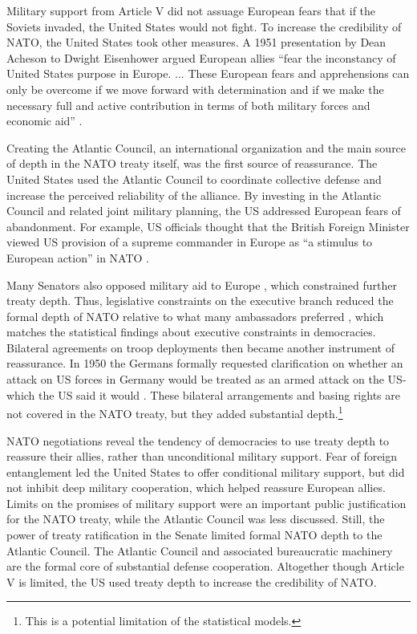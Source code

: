 \documentclass[12pt]{article}
\begin{document}
Military support from Article V did not assuage European fears that if the Soviets invaded, the United States would not fight. 
To increase the credibility of NATO, the United States took other measures.  
A 1951 presentation by Dean Acheson to Dwight Eisenhower argued European allies ``fear the inconstancy of United States purpose in Europe. ... These European fears and apprehensions can only be overcome if we move forward with determination and if we make the necessary full and active contribution in terms of both military forces and economic aid'' \citep[pg. 3]{Acheson1951}. 


Creating the Atlantic Council, an international organization and the main source of depth in the NATO treaty itself, was the first source of reassurance. 
The United States used the Atlantic Council to coordinate collective defense and increase the perceived reliability of the alliance. 
By investing in the Atlantic Council and related joint military planning, the US addressed European fears of abandonment. 
For example, US officials thought that the British Foreign Minister viewed US provision of a supreme commander in Europe as ``a stimulus to European action'' in NATO \citep{Acheson1950}. 


Many Senators also opposed military aid to Europe \citep[pg 285]{Acheson1969}, which constrained further treaty depth. 
Thus, legislative constraints on the executive branch reduced the formal depth of NATO relative to what many ambassadors preferred \citep[pg 277]{Acheson1969}, which matches the statistical findings about executive constraints in democracies.  
Bilateral agreements on troop deployments then became another instrument of reassurance. 
In 1950 the Germans formally requested clarification on whether an attack on US forces in Germany would be treated as an armed attack on the US- which the US said it would \citep[pg. 395]{Acheson1969}.  
These bilateral arrangements and basing rights are not covered in the NATO treaty, but they added substantial depth.\footnote{This is a potential limitation of the statistical models.}  


NATO negotiations reveal the tendency of democracies to use treaty depth to reassure their allies, rather than unconditional military support. 
Fear of foreign entanglement led the United States to offer conditional military support, but did not inhibit deep military cooperation, which helped reassure European allies. 
Limits on the promises of military support were an important public justification for the NATO treaty, while the Atlantic Council was less discussed. 
Still, the power of treaty ratification in the Senate limited formal NATO depth to the Atlantic Council. 
The Atlantic Council and associated bureaucratic machinery are the formal core of substantial defense cooperation. 
Altogether though Article V is limited, the US used treaty depth to increase the credibility of NATO. 
\end{document}
